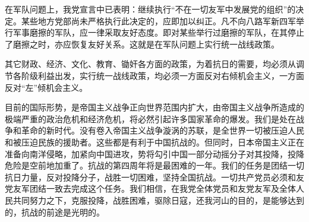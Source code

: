 在军队问题上，我党宣言中已表明：继续执行“不在一切友军中发展党的组织”的决定。某些地方党部尚未严格执行此决定的，应即加以纠正。凡不向八路军新四军举行军事磨擦的军队，应一律采取友好态度。即对某些举行过磨擦的军队，在其停止了磨擦之时，亦应恢复友好关系。这就是在军队问题上实行统一战线政策。

其它财政、经济、文化、教育、锄奸各方面的政策，为着抗日的需要，均必须从调节各阶级利益出发，实行统一战线政策，均必须一方面反对右倾机会主义，一方面反对“左”倾机会主义。

目前的国际形势，是帝国主义战争正向世界范围内扩大，由帝国主义战争所造成的极端严重的政治危机和经济危机，将必然引起许多国家革命的爆发。我们是处在战争和革命的新时代。没有卷入帝国主义战争漩涡的苏联，是全世界一切被压迫人民和被压迫民族的援助者。这些都是有利于中国抗战的。但同时，日本帝国主义正在准备向南洋侵略，加紧向中国进攻，势将勾引中国一部分动摇分子对其投降，投降危险是空前地加重了。抗战的第四周年将是最困难的一年。我们的任务是团结一切抗日力量，反对投降分子，战胜一切困难，坚持全国抗战。一切共产党员必须和友党友军团结一致去完成这个任务。我们相信，在我党全体党员和友党友军及全体人民共同努力之下，克服投降，战胜困难，驱除日寇，还我河山的目的，是能够达到的，抗战的前途是光明的。
